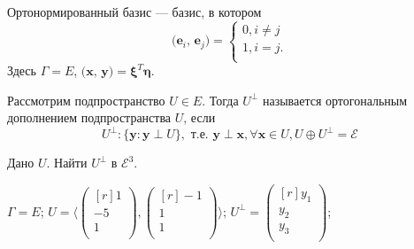 \begin{definition}
Ортонормированный базис --- базис, в котором
$$
\textbf{(e$_i$, e$_j$)}= %
\left\{
\begin{aligned}
0, i\ne j\\
1, i=j.\\
\end{aligned}
\right.$$
Здесь $\Gamma=E$, $\textbf{(x, y)}=\bm \xi^{T} \bm \eta$.
\end{definition}

\begin{definition}
Рассмотрим подпространство $U\in E$.
Тогда $U^{\perp}$ называется ортогональным дополнением подпространства $U$, если
$$
U^{\perp}: \{\textbf{y}: \textbf{y}\perp U\},\text{ т.е. }\textbf{y}\perp \textbf{x},  \forall\textbf{x}\in U, U\oplus U^{\perp}= \mathcal{E}$$%
\end{definition}
\begin{prim}
Дано $U$. Найти $U^{\perp}$ в $\mathcal{E}^3$. %
\end{prim}
$ \Gamma=E$; 
$U=\langle \left(
\begin{smallmatrix*}[r]
1\\ -5\\ 1\\ 
\end{smallmatrix*}
\right) ,
\left(
\begin{smallmatrix*}[r]
-1\\ 1\\ 1\\ 
\end{smallmatrix*}
\right) \rangle $;
\:\:
$U^{\perp}=\left(
\begin{smallmatrix*}[r]
y_1\\ y_2\\ y_3\\ 
\end{smallmatrix*}
\right)$;

